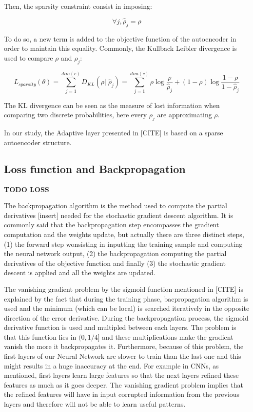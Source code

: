 \documentclass[master,final,11pt]{iscs-thesis}
\begin{document}
Then, the sparsity constraint consist in imposing:

\[
\forall j,  \hat{\rho}_j = \rho
\]

To do so, a new term is added to the objective function of the autoencoder in order to maintain this equality. Commonly, the Kullback Leibler divergence is used to compare $\rho$ and $\rho_j$:

\[
L_{sparsity}(\theta) = \sum_{j=1}^{dim(c)}{D_{KL}(\rho||\hat{\rho}_j)} = \sum_{j=1}^{dim(c)}{\rho\log \frac{\rho}{\hat{\rho}_j}} + (1-\rho)\log \frac{1-\rho}{1-\hat{\rho}_j}
\]

The KL divergence can be seen as the measure of lost information when comparing two discrete probabilities, here every $\rho_j$ are approximating $\rho$.

In our study, the Adaptive layer presented in [CITE] is based on a sparse autoencoder structure.


\subsection{Loss function and Backpropagation}

\textbf{TODO LOSS} 

The backpropagation algorithm \cite{BACKPROP} is the method used to compute the partial derivatives [insert] needed for the stochastic gradient descent algorithm. It is commonly said that the backpropagation step encompasses the gradient computation and the weights update, but actually there are three distinct steps, (1) the forward step wonsisting in inputting the training sample and computing the neural network output, (2) the backpropagation computing the partial derivatives of the objective function and finally (3) the stochastic gradient descent is applied and all the weights are updated.

The vanishing gradient problem by the sigmoid function mentioned in [CITE] is explained by the fact that during the training phase, bacpropagation algorithm is used and the minimum (which can be local) is searched iteratively in the opposite direction of the error derivative. During the backpropagation process, the sigmoid derivative function is used and multipled between each layers. The problem is that this function lies in $(0, 1/4]$ and these multiplications make the gradient vanish the more it backpropagates it.
Furthermore, because of this problem, the first layers of our Neural Network are slower to train than the last one and this might results in a huge inaccuracy at the end. For example in CNNs, as mentioned, first layers learn large features so that the next layers refined these features as much as it goes deeper. The vanishing gradient problem implies that the refined features will have in input corrupted information from the previous layers and therefore will not be able to learn useful patterns.
\end{document}
